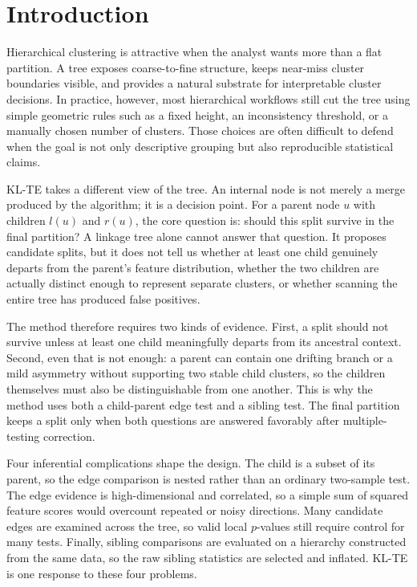 
\section{Introduction}

Hierarchical clustering is attractive when the analyst wants more than a flat
partition. A tree exposes coarse-to-fine structure, keeps near-miss cluster
boundaries visible, and provides a natural substrate for interpretable cluster
decisions. In practice, however, most hierarchical
workflows still cut the tree using simple geometric rules such as a fixed height,
an inconsistency threshold, or a manually chosen number of clusters. Those
choices are often difficult to defend when the goal is not only descriptive
grouping but also reproducible statistical claims.

KL-TE takes a different view of the tree. An internal node is not merely a
merge produced by the algorithm; it is a decision point. For a parent node $u$ with children
$l(u)$ and $r(u)$, the core question is: should this split survive in the final
partition? A linkage tree alone cannot answer that question. It proposes
candidate splits, but it does not tell us whether at least one child genuinely
departs from the parent's feature distribution, whether the two children are
actually distinct enough to represent separate clusters, or whether scanning
the entire tree has produced false positives.

The method therefore requires two kinds of evidence. First, a split should not
survive unless at least one child meaningfully departs from its ancestral
context. Second, even that is not enough: a parent can contain one drifting
branch or a mild asymmetry without supporting two stable child clusters, so the
children themselves must also be distinguishable from one another. This is why
the method uses both a child-parent edge test and a sibling test. The final
partition keeps a split only when both questions are answered favorably after
multiple-testing correction.

Four inferential complications shape the design. The child is a subset of its
parent, so the edge comparison is nested rather than an ordinary two-sample
test. The edge evidence is high-dimensional and correlated, so a simple sum of
squared feature scores would overcount repeated or noisy directions. Many candidate edges
are examined across the tree, so valid local $p$-values still require control
for many tests. Finally, sibling comparisons are evaluated on a hierarchy
constructed from the same data, so the raw sibling statistics are selected and
inflated. KL-TE is one response to these four problems.

